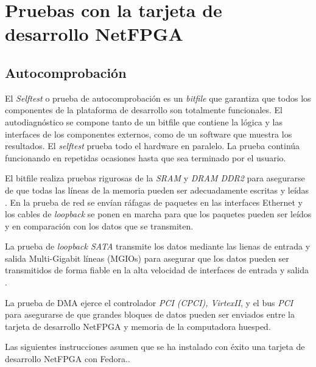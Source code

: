 \chapter{Pruebas con la tarjeta de desarrollo
NetFPGA}\label{ApexB}



\section{Autocomprobación}

El \emph{Selftest} o prueba de autocomprobación es un \emph{bitfile} que garantiza que todos los
componentes de la plataforma de desarrollo son totalmente funcionales. El
autodiagnóstico se compone tanto de un bitfile que contiene la lógica y
las interfaces de los componentes externos, como de un software que muestra los
resultados. El \emph{selftest} prueba todo el hardware en paralelo. La
prueba continúa funcionando en repetidas ocasiones hasta que sea terminado por
el usuario. 

El bitfile realiza pruebas rigurosas de la \emph{SRAM} y \emph{DRAM DDR2} para
asegurarse de que todas las líneas de la memoria pueden ser adecuadamente
escritas y leídas . En la prueba de red se envían ráfagas de paquetes en las
interfaces Ethernet y los cables de \emph{loopback}  se ponen en marcha para que
los paquetes pueden ser leídos y en comparación con los datos que se transmiten.

La prueba de \emph{loopback SATA} transmite los datos mediante las lienas de
entrada y salida  Multi-Gigabit líneas (MGIOs) para asegurar que los datos
pueden ser transmitidos de forma fiable en la alta velocidad de interfaces de
entrada y salida .

La prueba de DMA ejerce el controlador \emph{PCI (CPCI), VirtexII}, y el bus
\emph{PCI} para asegurarse de que grandes bloques de datos pueden ser enviados
entre la tarjeta de desarrollo NetFPGA y  memoria de la computadora huesped.


Las siguientes instrucciones asumen que se ha instalado con éxito una tarjeta
de desarrollo NetFPGA con Fedora.\cite{verifing}.

